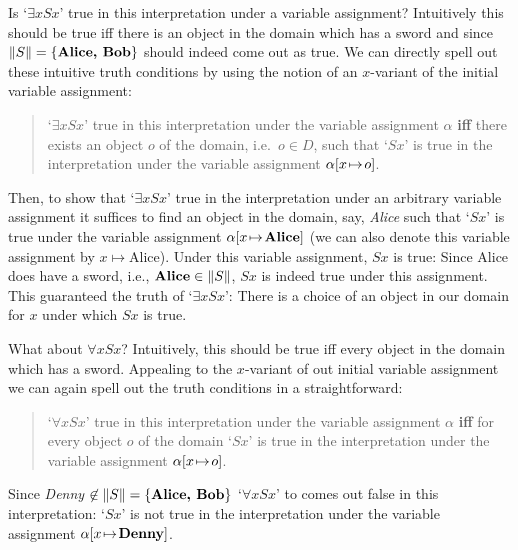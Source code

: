 \noindent Is `$\exists x Sx$' true in this interpretation under a variable assignment? Intuitively this should be true iff there is an object in the domain which has a sword and since $\|S\|=\{\text{\emph{Alice, Bob}}\}$ should indeed come out as true. We can directly spell out these intuitive truth conditions by using the notion of an  $x$-variant of the initial variable assignment:
\begin{quote}
`$\exists x Sx$' true in this interpretation under the variable assignment $\alpha$ \textbf{iff} there exists an object $o$ of the domain, i.e.~$o\in D$, such that `$Sx$' is true in the interpretation under the variable assignment $\varvariant{\alpha}{x}{o}$.
\end{quote}
Then, to show that `$\exists x Sx$' true in the interpretation under an arbitrary variable assignment it suffices to find an object in the domain, say, \emph{Alice} such that `$Sx$' is true under the variable assignment $\varvariant{\alpha}{x}{\text{\emph{Alice}}}$  (we can also denote this variable assignment by $x\mapsto \text{Alice}$). Under this variable assignment, $Sx$ is true: Since Alice does have a sword, i.e., $\text{\emph{Alice}}\in\|S\|$, $Sx$ is indeed true under this assignment. This guaranteed the truth of `$\exists x Sx$': There is a choice of an object in our domain for $x$ under which $Sx$ is true.

What about $\forall x Sx$? Intuitively, this should be true iff every object in the domain which has a sword. Appealing to the $x$-variant of out initial variable assignment we can again spell out the truth conditions in a straightforward:
\begin{quote}
`$\forall x Sx$' true in this interpretation under the variable assignment $\alpha$ \textbf{iff} for every object $o$ of the domain `$Sx$' is true in the interpretation under the variable assignment $\varvariant{\alpha}{x}{o}$.
\end{quote}
 Since \emph{Denny} $\not\in\|S\|=\{\text{\emph{Alice, Bob}}\}$ `$\forall x Sx$' to comes out false in this interpretation: `$Sx$' is not true in the interpretation under the variable assignment $\varvariant{\alpha}{x}{\emph{Denny}}$. 

